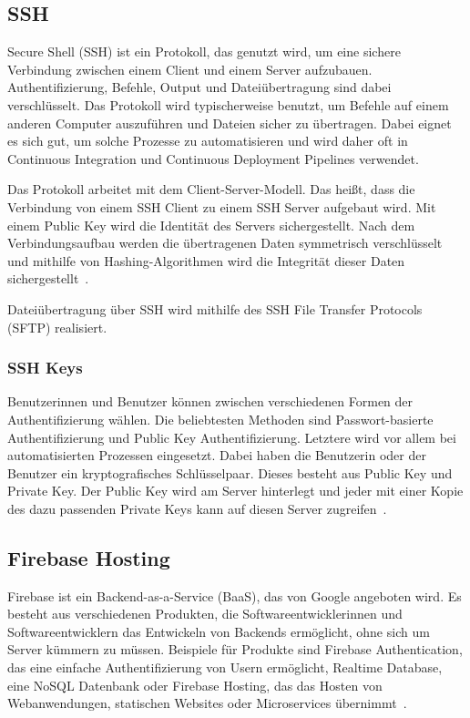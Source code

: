 \subsection{SSH}
Secure Shell (SSH) ist ein Protokoll, das genutzt wird, um eine sichere Verbindung zwischen einem
Client und einem Server aufzubauen.
 Authentifizierung, Befehle, Output und Dateiübertragung sind dabei verschlüsselt.
 Das Protokoll wird typischerweise benutzt, um Befehle auf einem anderen Computer auszuführen und Dateien sicher
 zu übertragen.
 Dabei eignet es sich gut, um solche Prozesse zu automatisieren und wird daher oft in Continuous Integration und
Continuous Deployment Pipelines verwendet.

Das Protokoll arbeitet mit dem Client-Server-Modell.
 Das heißt, dass die Verbindung von einem SSH Client zu einem SSH Server aufgebaut wird.
 Mit einem Public Key wird die Identität des Servers sichergestellt.
 Nach dem Verbindungsaufbau werden die übertragenen Daten symmetrisch verschlüsselt und mithilfe von
 Hashing-Algorithmen wird die Integrität dieser Daten sichergestellt~\cite{ssh}.

Dateiübertragung über SSH wird mithilfe des SSH File Transfer Protocols (SFTP) realisiert.

\subsubsection{SSH Keys}
Benutzerinnen und Benutzer können zwischen verschiedenen Formen der Authentifizierung wählen.
Die beliebtesten Methoden sind Passwort-basierte Authentifizierung und Public Key Authentifizierung.
Letztere wird vor allem bei automatisierten Prozessen eingesetzt.
Dabei haben die Benutzerin oder der Benutzer ein kryptografisches Schlüsselpaar.
Dieses besteht aus Public Key und Private Key.
Der Public Key wird am Server hinterlegt und jeder mit einer Kopie des dazu passenden Private Keys kann
auf diesen Server zugreifen~\cite{ssh-keys}.

\subsection{Firebase Hosting}
Firebase ist ein Backend-as-a-Service (BaaS), das von Google angeboten wird.
 Es besteht aus verschiedenen Produkten, die Softwareentwicklerinnen und Softwareentwicklern das Entwickeln
von Backends ermöglicht, ohne sich um Server kümmern zu müssen.
 Beispiele für Produkte sind Firebase Authentication, das eine einfache Authentifizierung von Usern ermöglicht,
Realtime Database, eine NoSQL Datenbank oder Firebase Hosting, das das Hosten von Webanwendungen,
statischen Websites oder Microservices übernimmt~\cite{firebase}.

